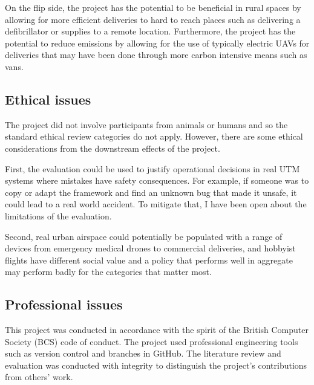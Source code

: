 \begin{appendices}
On the flip side, the project has the potential to be beneficial in rural spaces by allowing for more efficient deliveries to hard to reach places such as delivering a defibrillator or supplies to a remote location. Furthermore, the project has the potential to reduce emissions by allowing for the use of typically electric UAVs for deliveries that may have been done through more carbon intensive means such as vans.


\subsection{Ethical issues}

The project did not involve participants from animals or humans and so the standard ethical review categories do not apply. However, there are some ethical considerations from the downstream effects of the project. \par

\vspace{1em}

First, the evaluation could be used to justify operational decisions in real UTM systems where mistakes have safety consequences. For example, if someone was to copy or adapt the framework and find an unknown bug that made it unsafe, it could lead to a real world accident. To mitigate that, I have been open about the limitations of the evaluation. 

\vspace{1em}

Second, real urban airspace could potentially be populated with a range of devices from emergency medical drones to commercial deliveries, and hobbyist flights have different social value and a policy that performs well in aggregate may perform badly for the categories that matter most.\par

\vspace{1em}

\subsection{Professional issues}

This project was conducted in accordance with the spirit of the British Computer Society (BCS) code of conduct. The project used professional engineering tools such as version control and branches in GitHub. The literature review and evaluation was conducted with integrity to distinguish the project's contributions from others' work. \par


\end{appendices}
